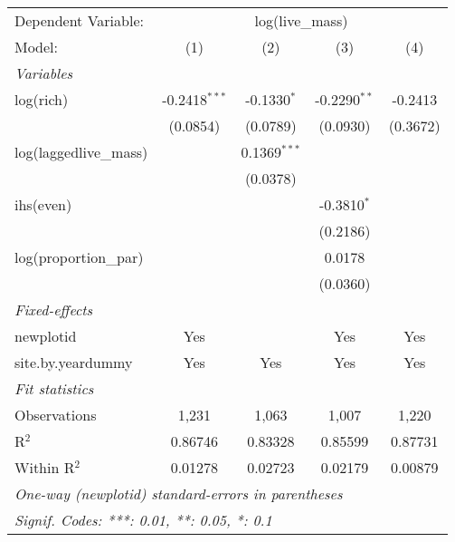 \begin{tabular}{lcccc}
\tabularnewline\midrule\midrule
Dependent Variable:&\multicolumn{4}{c}{log(live\_mass)}\\
Model:&(1) & (2) & (3) & (4)\\
\midrule \emph{Variables}&   &   &   &  \\
log(rich)&-0.2418$^{***}$ & -0.1330$^{*}$ & -0.2290$^{**}$ & -0.2413\\
  &(0.0854) & (0.0789) & (0.0930) & (0.3672)\\
log(laggedlive\_mass)&   & 0.1369$^{***}$ &    &   \\
  &   & (0.0378) &    &   \\
ihs(even)&   &    & -0.3810$^{*}$ &   \\
  &   &    & (0.2186) &   \\
log(proportion\_par)&   &    & 0.0178 &   \\
  &   &    & (0.0360) &   \\
\midrule \emph{Fixed-effects}&   &   &   &  \\
newplotid & Yes &  & Yes & Yes\\
site.by.yeardummy & Yes & Yes & Yes & Yes\\
\midrule \emph{Fit statistics}&  & & & \\
Observations & 1,231&1,063&1,007&1,220\\
R$^2$ & 0.86746&0.83328&0.85599&0.87731\\
Within R$^2$ & 0.01278&0.02723&0.02179&0.00879\\
\midrule\midrule\multicolumn{5}{l}{\emph{One-way (newplotid) standard-errors in parentheses}}\\
\multicolumn{5}{l}{\emph{Signif. Codes: ***: 0.01, **: 0.05, *: 0.1}}\\
\end{tabular}


